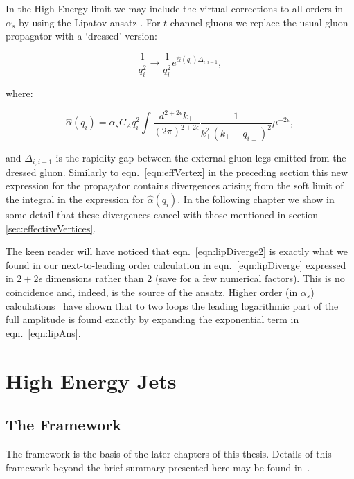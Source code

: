 	In the High Energy limit we may include the virtual corrections to all orders in $\alpha_s$ by using
	the Lipatov ansatz \cite{Kuraev:1976ge}.  For $t$-channel gluons we replace the usual
	gluon propagator with a `dressed' version:

	\begin{equation}
		\frac{1}{q_i^2}\rightarrow\frac{1}{q_i^2}e^{\hat{\alpha}(q_i)\Delta_{i,i-1}},
		\label{eqn:lipAns}
	\end{equation}

	where:

	\begin{equation}
		\hat{\alpha}(q_i) = \alpha_sC_Aq_i^2\int \frac{d^{2+2\epsilon}k_{\perp}}{(2\pi)^{2+2\epsilon}}
		\frac{1}{k^2_\perp(k_\perp - q_{i\perp})^2}\mu^{-2\epsilon},
		\label{eqn:lipDiverge2}
	\end{equation}

	and $\Delta_{i,i-1}$ is the rapidity gap between the external gluon legs emitted from
	the dressed gluon.  Similarly to eqn.~\eqref{eqn:effVertex} in the preceding section this
	new expression for the propagator contains divergences arising from the soft limit
	of the integral in the expression for $\hat{\alpha}(q_i)$.  In the following chapter we
	show in some detail that these divergences cancel with those mentioned in section
	\ref{sec:effectiveVertices}.

	The keen reader will have noticed that eqn.~\eqref{eqn:lipDiverge2} is exactly what we
	found in our next-to-leading order calculation in eqn.~\eqref{eqn:lipDiverge} expressed
	in $2+2\epsilon$ dimensions rather than 2 (save for a few numerical factors).  This is
	no coincidence and, indeed, is the source of the ansatz.  Higher order (in $\alpha_s$)
	calculations~\cite{DelDuca:1995hf,9780511524387} have shown that to two loops the leading
	logarithmic part of the full amplitude is found exactly by expanding the exponential
	term in eqn.~\eqref{eqn:lipAns}.

\section{High Energy Jets}
	\label{sec:HEJ}

	\subsection{The \hej Framework}

	The \hej framework is the basis of the later chapters of this thesis.  Details of this framework
	beyond the brief summary presented here may be found in~\cite{ZPaper,Andersen:2009nu,Andersen:2009he,
	Andersen:2011hs,Andersen:2012gk}.

